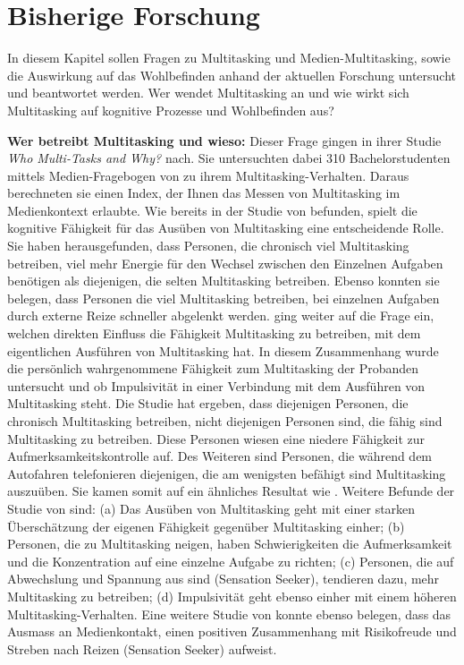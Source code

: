 \section{Bisherige Forschung}\label{section.bisherigeForschung}
In diesem Kapitel sollen Fragen zu Multitasking und Medien-Multitasking, sowie die Auswirkung auf das Wohlbefinden anhand der aktuellen Forschung untersucht und beantwortet werden. Wer wendet Multitasking an und wie wirkt sich Multitasking auf kognitive Prozesse und Wohlbefinden aus?
\par
\textbf{Wer betreibt Multitasking und wieso:} Dieser Frage gingen  in ihrer Studie \textit{Who Multi-Tasks and Why?} nach. Sie untersuchten dabei 310 Bachelorstudenten mittels Medien-Fragebogen von  zu ihrem Multitasking-Verhalten. Daraus berechneten sie einen Index, der Ihnen das Messen von Multitasking im Medienkontext erlaubte. Wie bereits in der Studie von  befunden, spielt die kognitive Fähigkeit für das Ausüben von Multitasking eine entscheidende Rolle. Sie haben herausgefunden, dass Personen, die chronisch viel Multitasking betreiben, viel mehr Energie für den Wechsel zwischen den Einzelnen Aufgaben benötigen als diejenigen, die selten Multitasking betreiben. Ebenso konnten sie belegen, dass Personen die viel Multitasking betreiben, bei einzelnen Aufgaben durch externe Reize schneller abgelenkt werden.  ging weiter auf die Frage ein, welchen direkten Einfluss die Fähigkeit Multitasking zu betreiben, mit dem eigentlichen Ausführen von Multitasking hat. In diesem Zusammenhang wurde die persönlich wahrgenommene Fähigkeit zum Multitasking der Probanden untersucht und ob Impulsivität in einer Verbindung mit dem Ausführen von Multitasking steht. Die Studie hat ergeben, dass diejenigen Personen, die chronisch Multitasking betreiben, nicht diejenigen Personen sind, die fähig sind Multitasking zu betreiben. Diese Personen wiesen eine niedere Fähigkeit zur Aufmerksamkeitskontrolle auf. Des Weiteren sind Personen, die während dem Autofahren telefonieren diejenigen, die am wenigsten befähigt sind Multitasking auszuüben. Sie kamen somit auf ein ähnliches Resultat wie . Weitere Befunde der Studie von  sind: (a) Das Ausüben von Multitasking geht mit einer starken Überschätzung der eigenen Fähigkeit gegenüber Multitasking einher; (b) Personen, die zu Multitasking neigen, haben Schwierigkeiten die Aufmerksamkeit und die Konzentration auf eine einzelne Aufgabe zu richten; (c) Personen, die auf Abwechslung und Spannung aus sind (Sensation Seeker), tendieren dazu, mehr Multitasking zu betreiben; (d) Impulsivität geht ebenso einher mit einem höheren Multitasking-Verhalten. Eine weitere Studie von  konnte ebenso belegen, dass das Ausmass an Medienkontakt, einen positiven Zusammenhang mit Risikofreude und Streben nach Reizen (Sensation Seeker) aufweist. 

